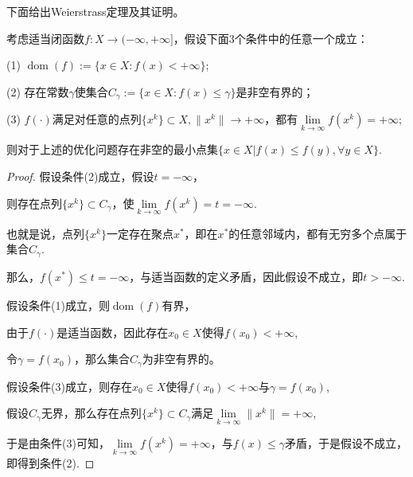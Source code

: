 下面给出Weierstrass定理\cite{2006OptimizationBook}及其证明。

\begin{theorem}[Weierstrass定理]
    考虑适当闭函数$f: X \rightarrow (-\infty, +\infty]$，假设下面3个条件中的任意一个成立：

    (1) $\mathop{\mathrm{dom}} (f):=\{x\in X: f(x) < +\infty\}$;

    (2) 存在常数$\gamma$使集合$C_{\gamma}:=\{x\in X: f(x) \leq \gamma\}$是非空有界的；

    (3) $f(\cdot)$满足对任意的点列$\{x^{k}\}\subset X, \|x^{k}\|\rightarrow +\infty$，都有$\lim\limits_{k\rightarrow \infty} f(x^{k})=+\infty$;

    则对于上述的优化问题存在非空的最小点集$\{x\in X | f(x) \leq f(y), \forall y\in X\}$.
\end{theorem}

\begin{proof}
    假设条件(2)成立，假设$t=-\infty$，
    
    则存在点列$\{x^{k}\}\subset C_{\gamma}$，使$\lim\limits_{k\rightarrow \infty}f(x^{k})=t=-\infty$.
    
    也就是说，点列$\{x^{k}\}$一定存在聚点$x^{*}$，即在$x^{*}$的任意邻域内，都有无穷多个点属于集合$C_{\gamma}$.

    那么，$f(x^{*})\leq t=-\infty$，与适当函数的定义矛盾，因此假设不成立，即$t>-\infty$.

    假设条件(1)成立，则$\mathop{\mathrm{dom}} (f)$有界，

    由于$f(\cdot)$是适当函数，因此存在$x_{0}\in X$使得$f(x_{0})<+\infty$,

    令$\gamma = f(x_{0})$，那么集合$C_{\gamma}$为非空有界的。

    假设条件(3)成立，则存在$x_{0}\in X$使得$f(x_{0})<+\infty$与$\gamma = f(x_{0})$,

    假设$C_{\gamma}$无界，那么存在点列$\{x^{k}\}\subset C_{\gamma}$满足$\lim\limits_{k\rightarrow \infty} \|x^{k}\| = +\infty$,

    于是由条件(3)可知，$\lim\limits_{k\rightarrow \infty}f(x^{k})=+\infty$，与$f(x)\leq \gamma$矛盾，于是假设不成立，即得到条件(2).
\end{proof}



